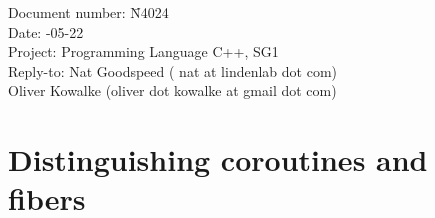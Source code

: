 \documentclass[a4paper,10pt,DIV15]{scrartcl}
\begin{document}
\small
\begin{tabbing}
    Document number: \= N4024\\
    Date:            -05-22 \\
    Project:         \> Programming Language C++, SG1 \\
    Reply-to:        \> Nat Goodspeed ( nat at lindenlab dot com)\\
                     \> Oliver Kowalke (oliver dot kowalke at gmail dot com)\\
\end{tabbing}

\section*{Distinguishing coroutines and fibers}


\tableofcontents












\end{document}
